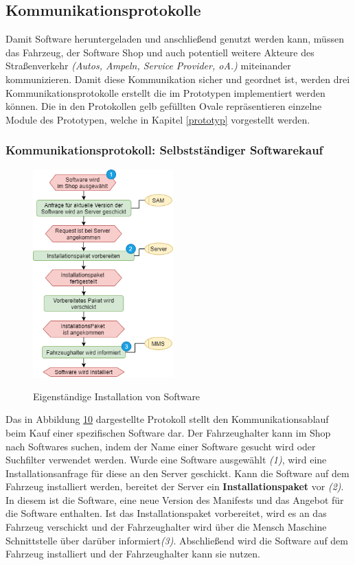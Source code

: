 \subsection{Kommunikationsprotokolle}\label{4.2}
Damit Software heruntergeladen und anschließend genutzt werden kann, müssen das Fahrzeug, der Software Shop und auch potentiell weitere Akteure des Straßenverkehr \textit{(Autos, Ampeln, Service Provider, oA.)} miteinander kommunizieren. Damit diese Kommunikation sicher und geordnet ist, werden drei Kommunikationsprotokolle erstellt die im Prototypen implementiert werden können. Die in den Protokollen gelb gefüllten Ovale repräsentieren einzelne Module des Prototypen, welche in Kapitel \ref{prototyp} vorgestellt werden.

\subsubsection{Kommunikationsprotokoll: Selbstständiger Softwarekauf}
\begin{figure}
	\centering
	\includegraphics[width=0.48\textwidth]{pictures/konzept-Eigene-Installation.png}	\label{img:eigenstaendigIns}
	\caption{Eigenständige Installation von Software}
\end{figure}
Das in Abbildung \hyperref[img:eigenstaendigIns]{10} dargestellte Protokoll stellt den Kommunikationsablauf beim Kauf einer spezifischen Software dar. Der Fahrzeughalter kann im Shop nach Softwares suchen, indem der Name einer Software gesucht wird oder Suchfilter verwendet werden. Wurde eine Software ausgewählt \textit{(1)}, wird eine Installationsanfrage für diese an den Server geschickt. Kann die Software auf dem Fahrzeug installiert werden, bereitet der Server ein \textbf{Installationspaket} vor \textit{(2)}. In diesem ist die Software, eine neue Version des Manifests und das Angebot für die Software enthalten. Ist das Installationspaket vorbereitet, wird es an das Fahrzeug verschickt und der Fahrzeughalter wird über die Mensch Maschine Schnittstelle über darüber informiert\textit{(3)}. Abschließend wird die Software auf dem Fahrzeug installiert und der Fahrzeughalter kann sie nutzen.
\clearpage
